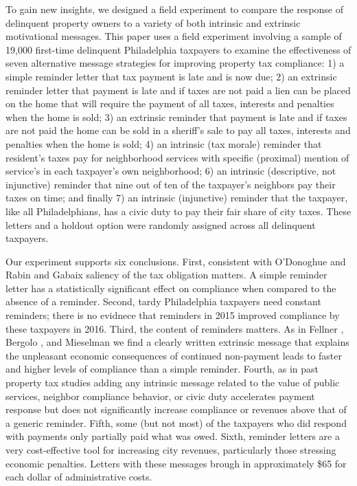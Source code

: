 \documentclass[12pt]{article}
\begin{document}
To gain new insights, we designed a field experiment to compare the
response of delinquent property owners to a variety of both intrinsic
and extrinsic motivational messages. This paper uses a field experiment involving a sample of 19,000 first-time delinquent Philadelphia taxpayers to examine the effectiveness of seven alternative message strategies for improving property tax compliance: 1) a simple reminder letter that tax payment is late and is now due; 2) an extrinsic reminder letter that payment is late and if taxes are not paid a lien can be placed on the home that will require the payment of all taxes, interests and penalties when the home is sold; 3) an extrinsic reminder that payment is late and if taxes are not paid the home can be sold in a sheriff's sale to pay all taxes, interests and penalties when the home is sold; 4) an intrinsic (tax morale) reminder that resident's taxes pay for neighborhood services with specific (proximal) mention of service's in each taxpayer's own neighborhood; 6) an intrinsic (descriptive, not injunctive) reminder that nine out of ten of the taxpayer's neighbors pay their taxes on time; and finally 7) an intrinsic (injunctive) reminder that the taxpayer, like all Philadelphians, has a civic duty to pay their fair share of city taxes. These letters and a holdout option were randomly assigned across all delinquent taxpayers.

Our experiment supports six conclusions.
First, consistent with O'Donoghue and Rabin \citeyear{DR-99} and Gabaix \citeyear{gabaix_2017} saliency of the tax obligation matters. A simple reminder
letter has a statistically significant effect on compliance when compared to the absence of a reminder.  Second, tardy Philadelphia taxpayers need constant reminders; there is no evidnece that reminders in 2015 improved compliance by these taxpayers in 2016. Third, the content of reminders matters. As in Fellner
\citeyear{Fellner-13}, Bergolo \citeyear{bergolo2017tax}, and
Mieselman \citeyear{meiselman2017ghostbusting} we find a clearly written extrinsic message that explains the unpleasant economic consequences of continued non-payment leads to faster and higher levels of compliance than a simple reminder. Fourth, as in past property tax studies \cite{delcarpio} adding any intrinsic message related to the value of public services, neighbor compliance behavior, or civic duty accelerates payment response but does not significantly increase compliance or revenues above that of a generic reminder. Fifth, some (but not most) of the taxpayers who did respond with payments only partially paid what was owed. Sixth, reminder letters are a very cost-effective tool for increasing city revenues, particularly those stressing economic penalties. Letters with these messages brough in approximately \$65 for each dollar of administrative costs.
\end{document}

